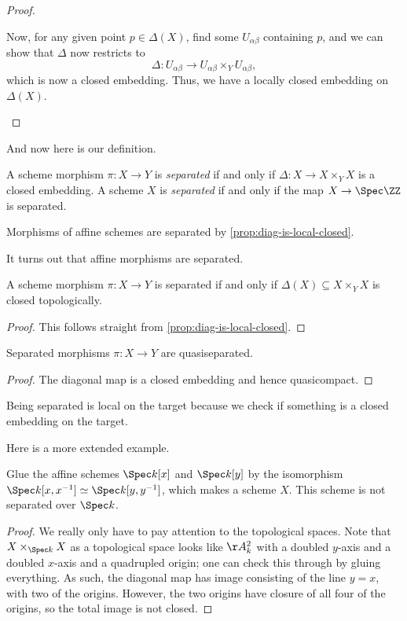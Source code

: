 \documentclass[../notes.tex]{subfiles}
\begin{document}
\begin{proof}
\begin{listalph}
		Now, for any given point $p\in\Delta(X)$, find some $U_{\alpha\beta}$ containing $p$, and we can show that $\Delta$ now restricts to
		\[\Delta\colon U_{\alpha\beta}\to U_{\alpha\beta}\times_YU_{\alpha\beta},\]
		which is now a closed embedding. Thus, we have a locally closed embedding on $\Delta(X)$.
		\qedhere
	\end{listalph}
\end{proof}
And now here is our definition.
\begin{definition}[Separated]
	A scheme morphism $\pi\colon X\to Y$ is \textit{separated} if and only if $\Delta\colon X\to X\times_YX$ is a closed embedding. A scheme $X$ is \textit{separated} if and only if the map $X\to\Spec\ZZ$ is separated.
\end{definition}
\begin{example}
	Morphisms of affine schemes are separated by \autoref{prop:diag-is-local-closed}.
\end{example}
\begin{example}
	It turns out that affine morphisms are separated.
\end{example}
\begin{corollary} \label{cor:separated-by-diag}
	A scheme morphism $\pi\colon X\to Y$ is separated if and only if $\Delta(X)\subseteq X\times_YX$ is closed topologically.
\end{corollary}
\begin{proof}
	This follows straight from \autoref{prop:diag-is-local-closed}.
\end{proof}
\begin{corollary}
	Separated morphisms $\pi\colon X\to Y$ are quasiseparated.
\end{corollary}
\begin{proof}
	The diagonal map is a closed embedding and hence quasicompact.
\end{proof}
\begin{remark}
	Being separated is local on the target because we check if something is a closed embedding on the target.
\end{remark}
Here is a more extended example.
\begin{exe}
	Glue the affine schemes $\Spec k[x]$ and $\Spec k[y]$ by the isomorphism $\Spec k[x,x^{-1}]\simeq\Spec k[y,y^{-1}]$, which makes a scheme $X$. This scheme is not separated over $\Spec k$.
\end{exe}
\begin{proof}
	We really only have to pay attention to the topological spaces. Note that $X\times_{\Spec k}X$ as a topological space looks like $\AA^2_k$ with a doubled $y$-axis and a doubled $x$-axis and a quadrupled origin; one can check this through by gluing everything. As such, the diagonal map has image consisting of the line $y=x$, with two of the origins. However, the two origins have closure of all four of the origins, so the total image is not closed.
\end{proof}
\end{document}
